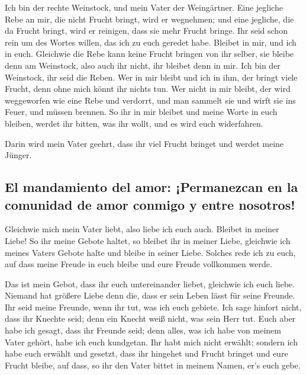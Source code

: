  Ich bin der rechte Weinstock, und mein Vater der
Weingärtner.  Eine jegliche Rebe an mir, die nicht Frucht
bringt, wird er wegnehmen; und eine jegliche, die da Frucht bringt, wird
er reinigen, dass sie mehr Frucht bringe.  Ihr seid schon
rein um des Wortes willen, das ich zu euch geredet habe. 
Bleibet in mir, und ich in euch. Gleichwie die Rebe kann keine Frucht
bringen von ihr selber, sie bleibe denn am Weinstock, also auch ihr
nicht, ihr bleibet denn in mir.  Ich bin der Weinstock,
ihr seid die Reben. Wer in mir bleibt und ich in ihm, der bringt viele
Frucht, denn ohne mich könnt ihr nichts tun.  Wer nicht in
mir bleibt, der wird weggeworfen wie eine Rebe und verdorrt, und man
sammelt sie und wirft sie ins Feuer, und müssen brennen. 
So ihr in mir bleibet und meine Worte in euch bleiben, werdet ihr
bitten, was ihr wollt, und es wird euch widerfahren.

 Darin wird mein Vater geehrt, dass ihr viel Frucht
bringet und werdet meine Jünger.

\hypertarget{el-mandamiento-del-amor-permanezcan-en-la-comunidad-de-amor-conmigo-y-entre-nosotros}{%
\subsection{El mandamiento del amor: ¡Permanezcan en la comunidad de
amor conmigo y entre
nosotros!}\label{el-mandamiento-del-amor-permanezcan-en-la-comunidad-de-amor-conmigo-y-entre-nosotros}}

 Gleichwie mich mein Vater liebt, also liebe ich euch
auch. Bleibet in meiner Liebe!  So ihr meine Gebote
haltet, so bleibet ihr in meiner Liebe, gleichwie ich meines Vaters
Gebote halte und bleibe in seiner Liebe.  Solches rede
ich zu euch, auf dass meine Freude in euch bleibe und eure Freude
vollkommen werde.

 Das ist mein Gebot, dass ihr euch untereinander liebet,
gleichwie ich euch liebe.  Niemand hat größere Liebe denn
die, dass er sein Leben lässt für seine Freunde.  Ihr
seid meine Freunde, wenn ihr tut, was ich euch gebiete. 
Ich sage hinfort nicht, dass ihr Knechte seid; denn ein Knecht weiß
nicht, was sein Herr tut. Euch aber habe ich gesagt, dass ihr Freunde
seid; denn alles, was ich habe von meinem Vater gehört, habe ich euch
kundgetan.  Ihr habt mich nicht erwählt; sondern ich habe
euch erwählt und gesetzt, dass ihr hingehet und Frucht bringet und eure
Frucht bleibe, auf dass, so ihr den Vater bittet in meinem Namen, er's
euch gebe.

